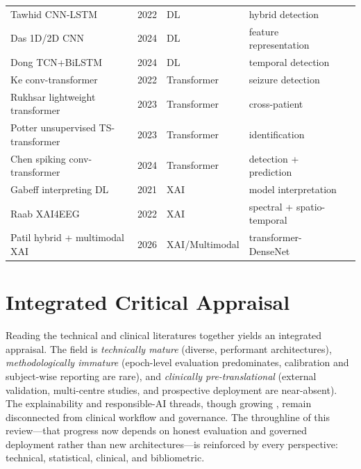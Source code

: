 \begin{table}[t]
\begin{tabular}{lllll}
Tawhid CNN-LSTM & 2022 & DL & hybrid detection & \cite{tawhid22}\\
Das 1D/2D CNN & 2024 & DL & feature representation & \cite{das24}\\
Dong TCN+BiLSTM & 2024 & DL & temporal detection & \cite{dong24}\\
Ke conv-transformer & 2022 & Transformer & seizure detection & \cite{ke22}\\
Rukhsar lightweight transformer & 2023 & Transformer & cross-patient & \cite{rukhsar23}\\
Potter unsupervised TS-transformer & 2023 & Transformer & identification & \cite{potter23}\\
Chen spiking conv-transformer & 2024 & Transformer & detection + prediction & \cite{chen24}\\
Gabeff interpreting DL & 2021 & XAI & model interpretation & \cite{gabeff21}\\
Raab XAI4EEG & 2022 & XAI & spectral + spatio-temporal & \cite{raab22}\\
Patil hybrid + multimodal XAI & 2026 & XAI/Multimodal & transformer-DenseNet & \cite{patil26}\\\bottomrule
\end{tabular}\end{table}

\section{Integrated Critical Appraisal}
Reading the technical and clinical literatures together yields an integrated appraisal. The field is \emph{technically mature} (diverse, performant architectures), \emph{methodologically immature} (epoch-level evaluation predominates, calibration and subject-wise reporting are rare), and \emph{clinically pre-translational} (external validation, multi-centre studies, and prospective deployment are near-absent). The explainability and responsible-AI threads, though growing \citep{vieira23,rathod22,mansour20,ijaz24}, remain disconnected from clinical workflow and governance. The throughline of this review---that progress now depends on honest evaluation and governed deployment rather than new architectures---is reinforced by every perspective: technical, statistical, clinical, and bibliometric.
